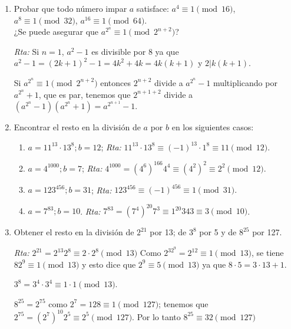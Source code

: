 \documentclass[a4paper,12pt,twoside,spanish,reqno]{amsbook}
\numberwithin{equation}{section}
\newcommand{\rta}{\noindent\textit{Rta: }}
\begin{document}
\begin{enumerate}
    
    \item Probar que todo número impar $a$ satisface: $a^4 \equiv 1\pmod{16}$, $a^8 \equiv 1\pmod{32}$, $a^{16}\equiv 1\pmod{64}$.\\ ¿Se puede asegurar que $a^{2^n} \equiv 1 \pmod{2^{n+2}}$?
        
    \rta Si $n=1$,  $a^2-1$ es divisible por 8 ya que $a^2-1 =(2k+1)^2-1=4k^2+4k=4k(k+1)$ y $2\vert k(k+1)$.
    
    Si $a^{2^n}\equiv 1 \pmod{2^{n+2}}$ entonces $2^{n+2}$ divide a $a^{2^n}-1$ multiplicando por $a^{2^n}+ 1$, que es par, tenemos que $2^{n+1+2}$ divide a $(a^{2^n}-1)(a^{2^n}+1)=a^{2^{n+1}}-1$.
    
    
    
    
\item Encontrar el resto en la división de $a$ por $b$ en los siguientes casos:
\begin{enumerate}
    \item $a = 11^{13}\cdot13^8 ; b = 12$;  \rta  $11^{13}\cdot13^8\equiv (-1)^{13}\cdot 1^8\equiv 11 \pmod{12}$.
    
    \item $a = 4^{1000}; b = 7$;  \rta  $4^{1000}=(4^6)^{166}4^4\equiv (4^2)^2\equiv 2^2 \pmod{12}$.
    
    \item $a = 123^{456}; b = 31$;  \rta  $123^{456}\equiv (-1)^{456}\equiv 1 \pmod{31}.$
    
    \item $a = 7^{83}; b = 10$.  \rta  $7^{83}= (7^4)^{20}7^3\equiv 1^{20}343\equiv 3 \pmod{10}$.
\end{enumerate}
    
    \item Obtener el resto en la división de $2^{21}$ por 13; de $3^8$ por 5 y de
    $8^{25}$ por 127.
        
    \rta  $2^{21}=2^{13}2^8\equiv 2\cdot2^8 \pmod{13}$ Como $2^32^9= 2^{12}\equiv 1 \pmod{13}$, se tiene $82^9\equiv1 \pmod{13}$ y esto dice que $2^9\equiv 5 \pmod{13}$ ya que $8\cdot 5=3\cdot 13 +1$.
    
    $3^8=3^4\cdot 3^4\equiv 1\cdot1 \pmod{13}$.
    
    $8^{25}=2^{75}$ como $2^7=128\equiv1 \pmod{127}$; tenemos que $2^{75}=(2^7)^{10}2^5\equiv2^5 \pmod{127}$.
    Por lo tanto $8^{25}\equiv32 \pmod{127}$
    
    

\end{enumerate}
\end{document}
